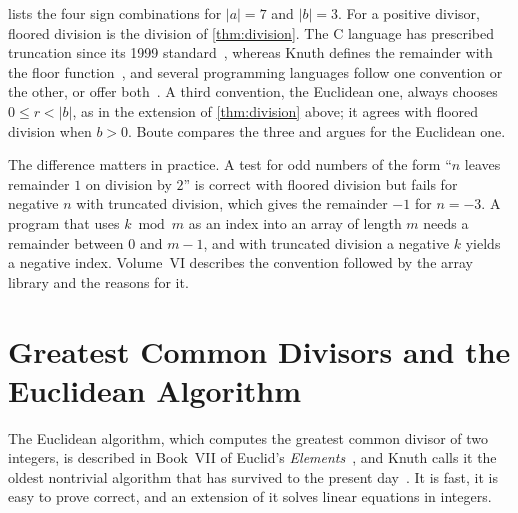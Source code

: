  lists the four sign combinations for $|a|=7$ and $|b|=3$. For a positive divisor, floored division is the division of \cref{thm:division}. The C language has prescribed truncation since its 1999 standard~\cite{iso9899-1999}, whereas Knuth defines the remainder with the floor function~\cite{graham1994concrete}, and several programming languages follow one convention or the other, or offer both~\cite{boute1992}. A third convention, the Euclidean one, always chooses $0\le r<|b|$, as in the extension of \cref{thm:division} above; it agrees with floored division when $b>0$. Boute compares the three and argues for the Euclidean one.

\begin{table}
\end{table}

The difference matters in practice. A test for odd numbers of the form ``$n$ leaves remainder $1$ on division by $2$'' is correct with floored division but fails for negative $n$ with truncated division, which gives the remainder $-1$ for $n=-3$. A program that uses $k\bmod m$ as an index into an array of length $m$ needs a remainder between $0$ and $m-1$, and with truncated division a negative $k$ yields a negative index. Volume~VI describes the convention followed by the array library and the reasons for it.

\section{Greatest Common Divisors and the Euclidean Algorithm}
\label{sec:gcd}

The Euclidean algorithm, which computes the greatest common divisor of two integers, is described in Book~VII of Euclid's \emph{Elements}~\cite{heath1956euclid}, and Knuth calls it the oldest nontrivial algorithm that has survived to the present day~\cite[Sect.~4.5.2]{knuth1997taocp2}. It is fast, it is easy to prove correct, and an extension of it solves linear equations in integers.

